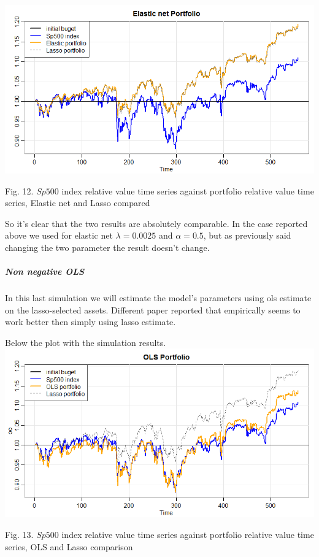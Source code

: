 \documentclass{article}%
\begin{document}
\includegraphics[scale=0.55]{elasticportfolio}
\begin{center}
\begin{small}
Fig. 12. $Sp500$ index relative value time series against portfolio relative value time series, Elastic net and Lasso compared
\\

\end{small}
\end{center}


So it's clear that the two results are absolutely comparable. In the case reported above we used for elastic net $\lambda=0.0025$ and $\alpha=0.5$, but as previously said changing the two parameter the result doesn't change.

\subparagraph{Non negative OLS}
In this last simulation we will estimate the model's parameters using ols estimate on the lasso-selected assets. Different paper reported that empirically seems to work better then simply using lasso estimate. 

Below the plot with the simulation results.
\\

\includegraphics[scale=0.55]{olsportfolio}
\begin{center}
\begin{small}
Fig. 13. $Sp500$ index relative value time series against portfolio relative value time series, OLS and Lasso comparison
\\

\end{small}
\end{center}
\end{document}
